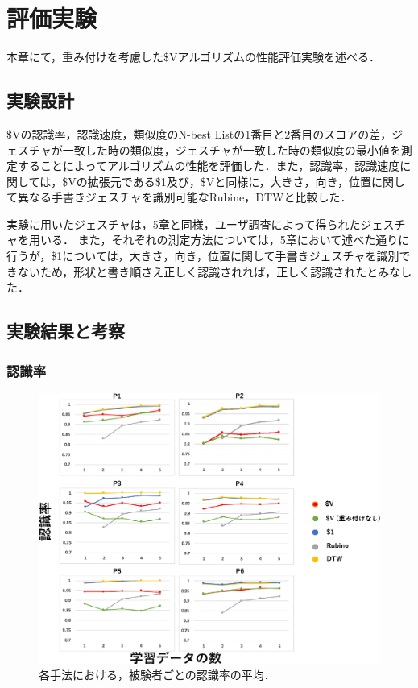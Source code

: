 \chapter{評価実験}
本章にて，重み付けを考慮した\$Vアルゴリズムの性能評価実験を述べる．

\section{実験設計}
\$Vの認識率，認識速度，類似度のN-best Listの1番目と2番目のスコアの差，ジェスチャが一致した時の類似度，ジェスチャが一致した時の類似度の最小値を測定することによってアルゴリズムの性能を評価した．また，認識率，認識速度に関しては，\$Vの拡張元である\$1及び，\$Vと同様に，大きさ，向き，位置に関して異なる手書きジェスチャを識別可能なRubine，DTWと比較した．

実験に用いたジェスチャは，5章と同様，ユーザ調査によって得られたジェスチャを用いる．
また，それぞれの測定方法については，5章において述べた通りに行うが，\$1については，大きさ，向き，位置に関して手書きジェスチャを識別できないため，形状と書き順さえ正しく認識されれば，正しく認識されたとみなした．

\section{実験結果と考察}
\subsection{認識率}
\begin{figure}[!h]
\centering
\includegraphics[width=1.0\columnwidth]{img/rec_rate.eps}
\caption{各手法における，被験者ごとの認識率の平均．}
\label{fig:rec_rate}
\end{figure}

